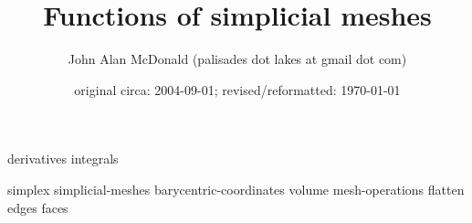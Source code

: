 \documentclass{PalisadesLakesReport}
\title{Functions of simplicial meshes}
\author{John Alan McDonald (palisades dot lakes at gmail dot com)}
\date{original circa: 2004-09-01; revised/reformatted: \today}
\begin{document}
\maketitle
\PalisadesLakesTableOfContents
\def\sharedFolder{../../shared/}





{derivatives}
{integrals}

{simplex}
{simplicial-meshes}
{barycentric-coordinates}
{volume}
{mesh-operations}
{flatten}
{edges}
{faces}

\end{document}
